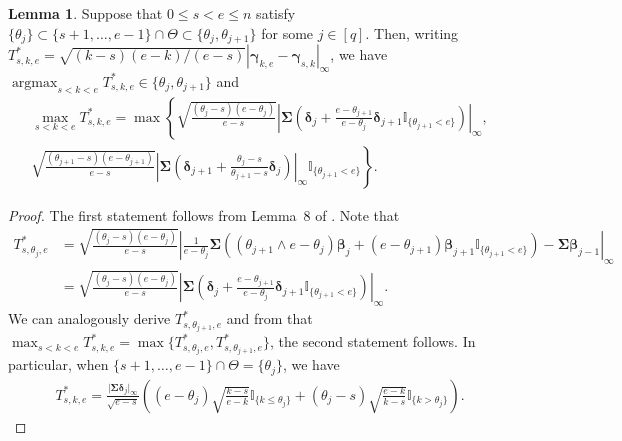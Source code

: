 \documentclass[11pt, a4paper]{article}
\renewcommand{\l}{\left}
\renewcommand{\r}{\right}
\newcommand{\cp}{\theta}
\newcommand{\Cp}{\Theta}
\theoremstyle{definition}
\theoremstyle{definition}
\theoremstyle{definition}
\newtheorem{lem}[thm]{Lemma}
\theoremstyle{definition}
\theoremstyle{definition}
\theoremstyle{remark}
\theoremstyle{definition}
\theoremstyle{definition}
\theoremstyle{definition}
\begin{document}
\begin{lem}
	\label{lem:cusum}
	Suppose that $0 \le s < e \le n$ satisfy $\{\cp_j\} \subset \{s + 1, \ldots, e - 1\} \cap \Cp \subset \{ \cp_j, \cp_{j + 1} \}$ for some $j \in [q]$. Then, writing $T^*_{s, k, e} = \sqrt{(k - s)(e - k)/(e - s)} \l\vert \bm\gamma_{k, e} - \bm\gamma_{s, k} \r\vert_\infty$, we have $\mathop{\arg\max}_{s < k < e} T^*_{s, k, e}  \in \{ \cp_j, \cp_{j + 1} \}$ and
	\begin{align*}
	\max_{s < k < e} T^*_{s, k, e} = \max\l\{ \sqrt{\frac{(\cp_j - s)(e - \cp_j)}{e - s}} \l\vert \bm\Sigma \l( \bm\delta_j + \frac{e - \cp_{j + 1}}{e - \cp_j} \bm\delta_{j + 1} \mathbb{I}_{\{\cp_{j + 1} < e\}} \r) \r\vert_\infty, \r. \\
	\l. \sqrt{\frac{(\cp_{j + 1} - s)(e - \cp_{j + 1})}{e - s}} \l\vert \bm\Sigma \l( \bm\delta_{j + 1} + \frac{\cp_j - s}{\cp_{j + 1} - s} \bm\delta_j \r) \r\vert_\infty 
	\mathbb{I}_{\{\cp_{j + 1} < e\}} \r\}.
	\end{align*}
\end{lem}

\begin{proof} 
	The first statement follows from Lemma~8 of \cite{wang2018high}.
	Note that
	\begin{align*}
	T^*_{s, \cp_j, e} &= \sqrt{\frac{(\cp_j - s)(e - \cp_j)}{e - s}} \l\vert \frac{1}{e - \cp_j} \bm\Sigma \l( (\cp_{j + 1} \wedge e - \cp_j) \bm\beta_j + (e - \cp_{j + 1}) \bm\beta_{j + 1} \mathbb{I}_{\{ \cp_{j + 1} < e\}} \r) - \bm\Sigma \bm\beta_{j - 1} \r\vert_\infty
	\\
	&= \sqrt{\frac{(\cp_j - s)(e - \cp_j)}{e - s}} \l\vert \bm\Sigma \l( \bm\delta_j + \frac{e - \cp_{j + 1}}{e - \cp_j} \bm\delta_{j + 1} \mathbb{I}_{\{\cp_{j + 1} < e\}} \r) \r\vert_\infty.
	\end{align*}
	We can analogously derive $T^*_{s, \cp_{j + 1}, e}$ and from that $\max_{s < k < e} T^*_{s, k, e} = \max\{ T^*_{s, \cp_j, e}, T^*_{s, \cp_{j + 1}, e} \}$, the second statement follows.
	In particular, when $\{s + 1, \ldots, e - 1\} \cap \Cp = \{\cp_j\}$, we have
	\begin{align}
	T^*_{s, k, e} = \frac{ \vert \bm\Sigma \bm\delta_j \vert_\infty }{\sqrt{e - s}} \l( (e - \cp_j) \sqrt{\frac{k - s}{e - k}} \mathbb{I}_{\{k \le \cp_j\}} + (\cp_j - s) \sqrt{\frac{e - k}{k - s}} \mathbb{I}_{\{k > \cp_j\}} \r).
	\label{eq:cusum:diff}
	\end{align}
\end{proof}
\end{document}
